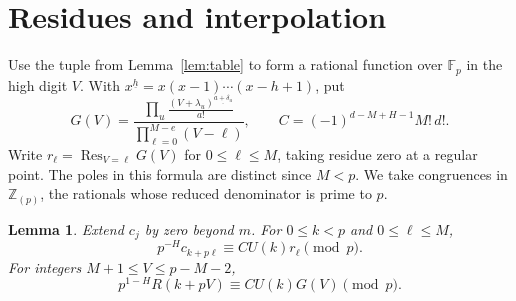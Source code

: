 \documentclass[11pt]{article}
\newtheorem{lemma}[theorem]{Lemma}
\newcommand{\Fp}{\mathbb F_p}
\newcommand{\Zp}{\mathbb Z_{(p)}}
\newcommand{\ff}[2]{#1^{\underline{#2}}}
\newcommand{\res}{\operatorname*{Res}}
\begin{document}
\section{Residues and interpolation}
Use the tuple from Lemma~\ref{lem:table} to form a rational function
over $\Fp$ in the high digit $V$. With
$\ff{x}{h}=x(x-1)\cdots(x-h+1)$, put
\[
 G(V)=\frac{\displaystyle\prod_u
          \frac{\ff{(V+\lambda_u)}{a+\delta_u}}{a!}}
                {\displaystyle\prod_{\ell=0}^{M-e}(V-\ell)},\qquad
 C=(-1)^{d-M+H-1}M!\,d! .
\]
Write $r_\ell=\res_{V=\ell}G(V)$ for $0\le\ell\le M$, taking
residue zero at a regular point. The poles in this formula are
distinct since $M<p$. We take congruences in $\Zp$, the rationals whose reduced
denominator is prime to $p$.

\begin{lemma}\label{lem:factor}
Extend $c_j$ by zero beyond $m$. For $0\le k<p$ and $0\le\ell\le M$,
\begin{equation}\label{eq:coeff}
 p^{-H}c_{k+p\ell}\equiv C U(k)r_\ell \pmod p .
\end{equation}
For integers $M+1\le V\le p-M-2$,
\begin{equation}\label{eq:away}
 p^{1-H}R(k+pV)\equiv C U(k)G(V) \pmod p .
\end{equation}
\end{lemma}
\end{document}
